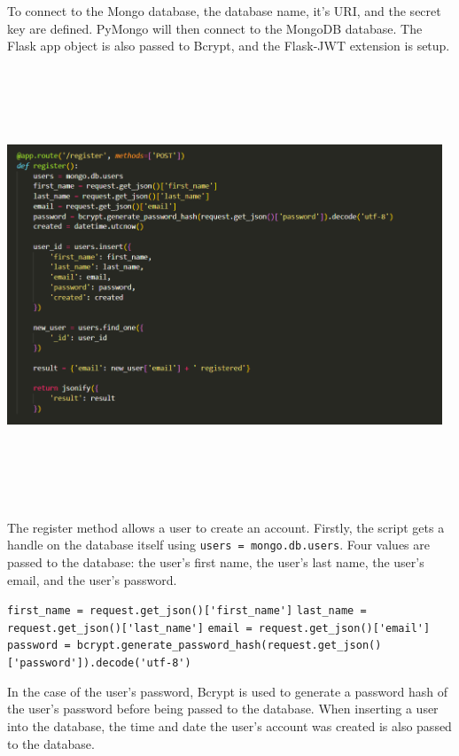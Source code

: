 To connect to the Mongo database, the database name, it's URI, and the secret key are defined. PyMongo will then connect to the MongoDB database. The Flask app object is also passed to Bcrypt, and the Flask-JWT extension is setup.

\newpage
\begin{center}
    \includegraphics[width=13cm,height=13cm,keepaspectratio]{images/backend2}
\end{center}
The register method allows a user to create an account. Firstly, the script gets a handle on the database itself using \lstinline{users = mongo.db.users}. Four values are passed to the database: the user's first name, the user's last name, the user's email, and the user's password. 

\medskip
\lstinline{first_name = request.get_json()['first_name']}
\newline
\lstinline{last_name = request.get_json()['last_name']}
\newline
\lstinline{email = request.get_json()['email']}
\newline
\lstinline{password = bcrypt.generate_password_hash(request.get_json()['password']).decode('utf-8')}

\bigskip
In the case of the user's password, Bcrypt is used to generate a password hash of the user's password before being passed to the database. When inserting a user into the database, the time and date the user's account was created is also passed to the database.


